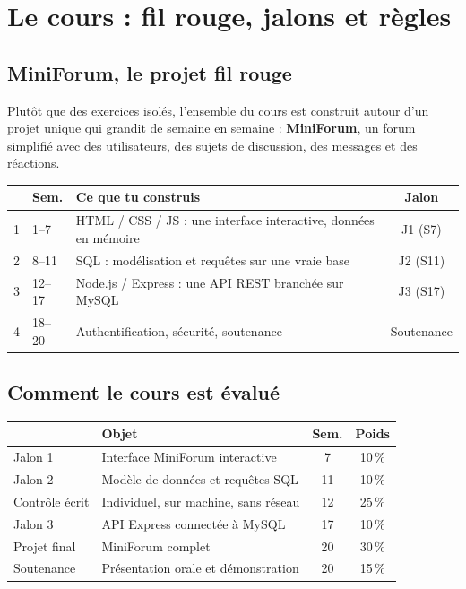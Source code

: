 \documentclass[a4paper,11pt]{article}
\newcommand{\hdr}[1]{\multicolumn{1}{l}{\color{white}\bfseries #1}}
\newcommand{\hdrc}[1]{\multicolumn{1}{c}{\color{white}\bfseries #1}}
\renewcommand{\arraystretch}{1.3}
\begin{document}
\newpage

\section{Le cours : fil rouge, jalons et règles}

\subsection{MiniForum, le projet fil rouge}

Plutôt que des exercices isolés, l'ensemble du cours est construit autour d'un projet unique qui grandit de semaine en semaine : \textbf{MiniForum}, un forum simplifié avec des utilisateurs, des sujets de discussion, des messages et des réactions.

\begin{center}
\renewcommand{\arraystretch}{1.0}
\begin{tabularx}{\linewidth}{clXc}
  \toprule
  \rowcolor{uniNavy}
  \hdrc{Phase} &  \hdr{Sem.} &  \hdr{Ce que tu construis} &  \hdrc{Jalon} \\
  \midrule
  \rowcolor{uniPaper}
  1 & 1--7   & HTML / CSS / JS : une interface interactive, données en mémoire & J1 (S7) \\
  2 & 8--11  & SQL : modélisation et requêtes sur une vraie base & J2 (S11) \\
  \rowcolor{uniPaper}
  3 & 12--17 & Node.js / Express : une API REST branchée sur MySQL & J3 (S17) \\
  4 & 18--20 & Authentification, sécurité, soutenance & Soutenance \\
  \bottomrule
\end{tabularx}
\end{center}

\subsection{Comment le cours est évalué}

\begin{center}
\renewcommand{\arraystretch}{1.0}
\begin{tabularx}{\linewidth}{lXcc}
  \toprule
  \rowcolor{uniNavy}
  \hdr{Épreuve} &  \hdr{Objet} &  \hdrc{Sem.} &  \hdrc{Poids} \\
  \midrule
  \rowcolor{uniPaper}
  Jalon 1 & Interface MiniForum interactive & 7 & 10\,\% \\
  Jalon 2 & Modèle de données et requêtes SQL & 11 & 10\,\% \\
  \rowcolor{uniPaper}
  Contrôle écrit & Individuel, sur machine, sans réseau & 12 & 25\,\% \\
  Jalon 3 & API Express connectée à MySQL & 17 & 10\,\% \\
  \rowcolor{uniPaper}
  Projet final & MiniForum complet & 20 & 30\,\% \\
  Soutenance & Présentation orale et démonstration & 20 & 15\,\% \\
  \bottomrule
\end{tabularx}
\end{center}
\end{document}
